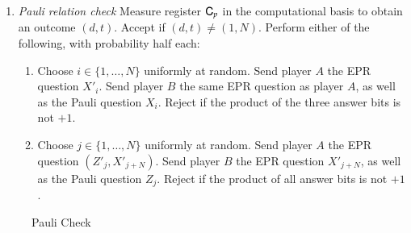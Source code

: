 \begin{center}
\begin{mdframed}
\begin{enumerate}
\item{\emph{Pauli relation check}} Measure register ${\textsf{C}}_p$  in the computational basis to obtain an outcome $(d,t)$. Accept if $(d,t)\neq (1,N)$. Perform either of the following, with probability half each:
\begin{enumerate}
\item Choose $i\in\{1,\ldots,N\}$ uniformly at random. Send player $A$ the EPR question $X'_i$. Send player $B$ the same EPR question as player $A$, as well as the Pauli question $X_i$. Reject if the product of the three answer bits is not $+1$. 
\item Choose $j\in\{1,\ldots,N\}$ uniformly at random. Send player $A$ the EPR question $(Z'_j,X'_{j+N})$. Send player $B$ the EPR question $X'_{j+N}$, as well as the Pauli question $Z_j$. Reject if the product of all answer bits is not $+1$. 
\end{enumerate}
	\end{enumerate}    
\end{mdframed}
\end{center}
\begin{figure}[H]
\caption{Pauli Check}
\label{fig:pauli_check}
\end{figure}


